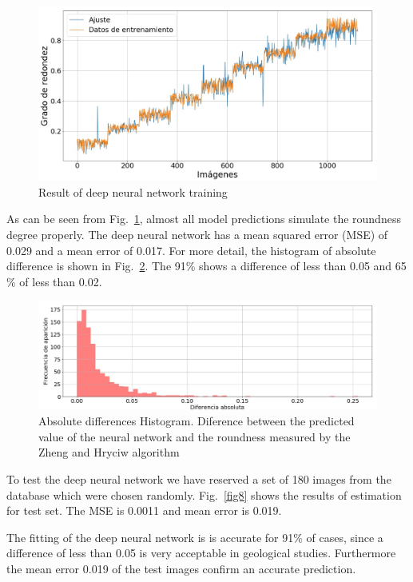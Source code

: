 \documentclass[conference]{IEEEtran}
\begin{document}
\begin{figure}[htbp]
\centerline{\includegraphics[scale=0.3]{fig6.png}}
\caption{Result of deep neural network training}
\label{fig6}
\end{figure}

As can be seen from Fig.~\ref{fig6}, almost all model predictions simulate the roundness degree properly. The deep neural network has a mean squared error (MSE) of 0.029 and a mean error of 0.017. For more detail, the histogram of absolute difference is shown in Fig.~\ref{fig7}. The 91\% shows a difference of less than 0.05 and 65 \% of less than 0.02.


\begin{figure}[htbp]
\centerline{\includegraphics[scale=0.3]{fig7.png}}
\caption{Absolute differences Histogram. Diference between the predicted value of the neural network and the roundness measured by the Zheng and Hryciw algorithm}
\label{fig7}
\end{figure}

To test the deep neural network we have reserved a set of 180 images from the database which were chosen randomly. Fig.~\ref{fig8} shows the results of estimation for test set. The MSE is 0.0011 and mean error is 0.019.

The fitting of the deep neural network is  is accurate for 91\% of cases, since a difference of less than 0.05 is very acceptable in geological studies. Furthermore the mean error 0.019 of the test images confirm an accurate prediction.
\end{document}
